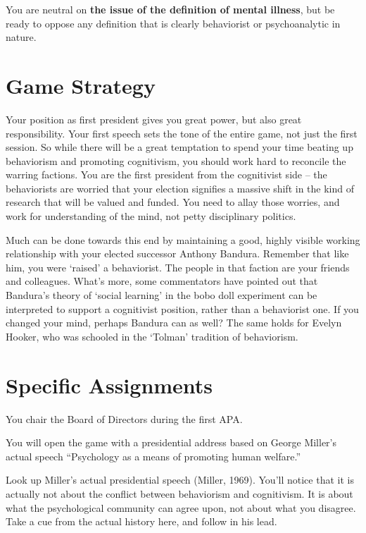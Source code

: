 \begin{refsection}
You are neutral on \textbf{the issue of the definition of mental illness}, but be ready to oppose any definition that is clearly behaviorist or psychoanalytic in nature.

\section{Game Strategy}
\label{gamestrategy}

Your position as first president gives you great power, but also great responsibility. Your first speech sets the tone of the entire game, not just the first session. So while there will be a great temptation to spend your time beating up behaviorism and promoting cognitivism, you should work hard to reconcile the warring factions. You are the first president from the cognitivist side – the behaviorists are worried that your election signifies a massive shift in the kind of research that will be valued and funded. You need to allay those worries, and work for understanding of the mind, not petty disciplinary politics.

Much can be done towards this end by maintaining a good, highly visible working relationship with your elected successor Anthony Bandura. Remember that like him, you were `raised' a behaviorist. The people in that faction are your friends and colleagues. What's more, some commentators have pointed out that Bandura's theory of `social learning' in the bobo doll experiment can be interpreted to support a cognitivist position, rather than a behaviorist one. If you changed your mind, perhaps Bandura can as well? The same holds for Evelyn Hooker, who was schooled in the `Tolman' tradition of behaviorism.

\section{Specific Assignments}
\label{specificassignments}

You chair the Board of Directors during the first APA.

You will open the game with a presidential address based on George Miller's actual speech ``Psychology as a means of promoting human welfare.''

Look up Miller's actual presidential speech (Miller, 1969). You'll notice that it is actually not about the conflict between behaviorism and cognitivism. It is about what the psychological community can agree upon, not about what you disagree. Take a cue from the actual history here, and follow in his lead.


\end{refsection}
